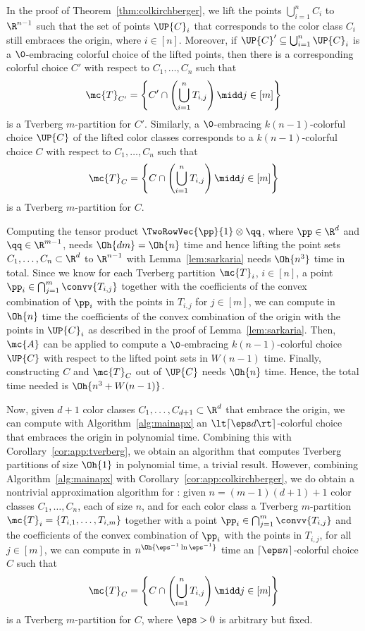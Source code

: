 \begin{prf}
  In the proof of Theorem~\ref{thm:colkirchberger},
  we lift the points $\bigcup_{i=1}^n C_i$ to $\R^{n-1}$ such that the
  set of points $\UP{C}_i$ that corresponds to the color class $C_i$
  still
  embraces the origin, where $i \in [n]$. Moreover, if $\UP{C}' \subseteq
  \bigcup_{i=1}^n \UP{C}_i$ is a $\0$-embracing colorful choice of the 
  lifted points, then there is a corresponding colorful choice $C'$ 
  with respect to $C_1,\dots,C_n$ such that
\[
  \mc{T}_{C'} = \left\{ C' \cap \left( \bigcup_{i=1}^n T_{i,j} \right)
  \midd j \in [m] \right\}
\]
is a Tverberg $m$-partition for $C'$.
Similarly, a $\0$-embracing $k(n-1)$-colorful choice $\UP{C}$ of the
lifted color classes corresponds to a $k(n-1)$-colorful choice $C$ with 
respect to $C_1,\dots,C_n$ such that
\[
  \mc{T}_{C} = \left\{ C \cap \left( \bigcup_{i=1}^n T_{i,j} \right)
  \midd j \in [m] \right\}
\]
is a Tverberg $m$-partition for $C$.

Computing the tensor product $\TwoRowVec{\pp}{1} \otimes \qq$, where 
$\pp \in \R^{d}$ and $\qq \in
\R^{m-1}$, needs $\Oh{dm} = \Oh{n}$ time and hence
lifting the point sets $C_1,\dots,C_n \subset \R^d$ to $\R^{n-1}$ with
Lemma~\ref{lem:sarkaria} needs $\Oh{n^3}$ time in total.
Since we know for each Tverberg partition $\mc{T}_i$, $i \in [n]$, a point
$\pp_i \in \bigcap_{j=1}^m \convv{T_{i,j}}$ together with the
coefficients of the convex combination of $\pp_i$ with the points in 
$T_{i,j}$ for $j \in [m]$, we can compute in $\Oh{n}$ time the 
coefficients of the convex combination of the origin with the points 
in $\UP{C}_i$ as described in the proof of Lemma~\ref{lem:sarkaria}.
Then, $\mc{A}$ can be applied to compute a $\0$-embracing $k(n-1)$-colorful
choice $\UP{C}$ with respect to the lifted point sets in
$W(n-1)$ time. Finally, constructing $C$ and $\mc{T}_C$ out of
$\UP{C}$ needs
$\Oh{n}$ time. Hence, the total time needed is $\Oh{n^3 + W(n-1)}$.
\end{prf}

Now, given $d+1$ color classes $C_1,\dots,C_{d+1} \subset \R^d$ that 
embrace the origin, we can compute with Algorithm~\ref{alg:mainapx} an 
$\lt\lceil \eps d\rt\rceil$-colorful choice that embraces
the origin in polynomial time. Combining this
with Corollary~\ref{cor:app:tverberg},
we obtain an algorithm that computes Tverberg partitions of size 
$\Oh{1}$ in polynomial time, a trivial result.
However, combining Algorithm~\ref{alg:mainapx} with
Corollary~\ref{cor:app:colkirchberger}, we do obtain a nontrivial 
approximation algorithm for \ColKirchberger: given $n =
(m-1)(d+1)+1$ color classes $C_1,\dots,C_n$, each of size $n$, and for each
color class a Tverberg $m$-partition 
$\mc{T}_i = \left\{T_{i,1},\dots,T_{i,m} \right\}$ together with a
point $\pp_i \in \bigcap_{j=1}^m \convv{T_{i,j}}$ and the coefficients 
of the convex combination of $\pp_i$ with the points in $T_{i,j}$, for 
all $j \in [m]$, we can compute
in $n^{\Oh{\eps^{-1} \ln \eps^{-1}}}$ time
an $\lceil \eps n \rceil$-colorful choice $C$ such that
\[
  \mc{T}_{C} = \left\{ C \cap \left( \bigcup_{i=1}^n T_{i,j} \right)
  \midd j \in [m] \right\}
\]
is a Tverberg $m$-partition for $C$, where $\eps > 0$ is arbitrary but 
fixed.
